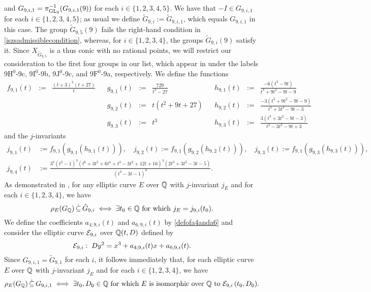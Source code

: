 and $G_{9,i,1} = \pi_{\operatorname{GL}_2}^{-1}(G_{9,i,1}(9))$ for each $i \in \{1, 2, 3, 4, 5 \}$. We have that $-I \in G_{9,i,1}$ for each $i \in \{1, 2, 3, 4, 5 \}$; as usual we define $\tilde{G}_{9,i} := \tilde{G}_{9,i,1}$, which equals $G_{9,i,1}$ in this case. The group $\tilde{G}_{9,5}(9)$ fails the right-hand condition in \eqref{iszsadmissiblecondition}, whereas, for $i \in \{ 1, 2, 3, 4 \}$, the groups $\tilde{G}_{9,i}(9)$ satisfy it. Since $X_{\tilde{G}_{9,5}}$ is a thus conic with no rational points, we will restrict our consideration to the first four groups in our list, which appear in \cite{sutherlandzywina} under the labels 9$\text{H}^0$-9c, 9$\text{I}^0$-9b, 9$\text{J}^0$-9c, and 9$\text{F}^0$-9a, respectively. We define the functions
\[
\begin{array}{lllllllllll}
f_{9,1}(t) &:= & \frac{(t+3)^3(t+27)}{t} & & g_{9,1}(t) &:= & \frac{729}{t^3-27} & & h_{9,1}(t) &:= & \frac{-6(t^3 - 9t)}{t^3 + 9t^2 - 9t - 9} \\
& & & & g_{9,2}(t) &:= & t(t^2 + 9t + 27) & & h_{9,2}(t) &:= & \frac{-3(t^3 + 9t^2 - 9t - 9)}{t^3 + 3t^2 - 9t - 3} \\
& & & & g_{9,3}(t) &:= & t^3 & & h_{9,3}(t) &:= & \frac{3(t^3 + 3t^2 - 9t - 3)}{t^3 - 3t^2 - 9t + 3} 
\end{array}
\]
and the $j$-invariants
\[
\begin{split}
j_{9,1}(t) &:= f_{9,1}\left(g_{9,1}\left(h_{9,1}(t) \right) \right), \quad j_{9,2}(t) := f_{9,1}\left(g_{9,2}\left(h_{9,2}(t) \right) \right), \quad j_{9,3}(t) := f_{9,1}\left(g_{9,3}\left(h_{9,3}(t) \right) \right), \\
j_{9,4}(t) &:= \frac{3^7(t^2-1)^3(t^6 + 3t^5 + 6t^4 + t^3 - 3t^2 + 12t + 16)^3(2t^3 + 3t^2 - 3t - 5)}{(t^3 - 3t - 1)^9}.
\end{split}
\]
As demonstrated in \cite{sutherlandzywina}, for any elliptic curve $E$ over $\mathbb{Q}$ with $j$-invariant $j_E$ and for each $i \in \{1, 2, 3, 4 \}$, we have
\[
\rho_{E}(G_{\mathbb{Q}}) \, \dot\subseteq \, \tilde{G}_{9,i} \; \Longleftrightarrow \; \exists t_0 \in \mathbb{Q} \text{ for which } j_E = j_{9,i}(t_0).
\]
We define the coefficients $a_{4;9,i}(t)$ and $a_{6;9,i}(t)$ by \eqref{defofa4anda6} and consider the elliptic curve $\mathcal{E}_{9,i}$ over $\mathbb{Q}(t,D)$ defined by 
\[
\mathcal{E}_{9,i} : \; D y^2 = x^3 + a_{4;9,i}(t) x + a_{6;9,i}(t).
\]
Since $G_{9,i,1} = \tilde{G}_{9,1}$ for each $i$, it follows immediately that, for each elliptic curve $E$ over $\mathbb{Q}$ with $j$-invariant $j_E$ and for each $i \in \{1, 2, 3, 4 \}$, we have
\[
\rho_{E}(G_{\mathbb{Q}}) \, \dot\subseteq \, G_{9,i,1} \; \Longleftrightarrow \; \exists t_0, D_0 \in \mathbb{Q} \text{ for which $E$ is isomorphic over $\mathbb{Q}$ to $\mathcal{E}_{9,i}\left( t_0,D_0 \right)$.}
\]

